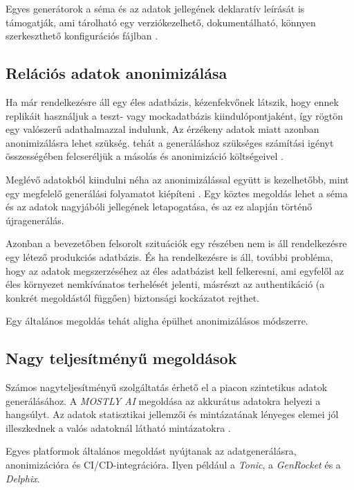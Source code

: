 \documentclass[
    parspace,
    noindent,
    nohyp,
]{elteiktdk}[2023/04/10]
\begin{document}
Egyes generátorok a séma és az adatok jellegének deklaratív leírását is támogatják,
ami tárolható egy verziókezelhető, dokumentálható, könnyen szerkeszthető konfigurációs fájlban%
\cite{Gao2024FakeDB,SoftwareDatamimic,SoftwarePydbgen}.

\subsection{Relációs adatok anonimizálása}

Ha már rendelkezésre áll egy éles adatbázis, kézenfekvőnek látszik,
hogy ennek replikáit használjuk a teszt- vagy mockadatbázis kiindulópontjaként,
így rögtön egy valószerű adathalmazzal indulunk,
Az érzékeny adatok miatt azonban anonimizálásra lehet szükség.
tehát a generáláshoz szükséges számítási igényt összességében
felcseréljük a másolás és anonimizáció költségeivel%
\cite{SoftwareArx,SoftwareAnonymeter}.

Meglévő adatokból kiindulni néha az anonimizálással együtt is kezelhetőbb,
mint egy megfelelő generálási folyamatot kiépíteni%
\cite{Johann2024AnonymizeOrSynthesize}.
Egy köztes megoldás lehet a séma és az adatok nagyjábóli jellegének letapogatása,
és az ez alapján történő újragenerálás.

Azonban a bevezetőben felsorolt szituációk egy részében
nem is áll rendelkezésre egy létező produkciós adatbázis.
És ha rendelkezésre is áll, további probléma,
hogy az adatok megszerzéséhez az éles adatbázist kell felkeresni,
ami egyfelől az éles környezet nemkívánatos terhelését jelenti,
másrészt az authentikáció (a konkrét megoldástól függően) biztonsági kockázatot rejthet.

Egy általános megoldás tehát aligha épülhet anonimizálásos módszerre.

\subsection{Nagy teljesítményű megoldások}

Számos nagyteljesítményű szolgáltatás érhető el a piacon szintetikus adatok generálásához.
A \textit{MOSTLY AI} megoldása az akkurátus adatokra helyezi a hangsúlyt.
Az adatok statisztikai jellemzői és mintázatának lényeges elemei
jól illeszkednek a valós adatoknál látható mintázatokra%
\cite{SoftwareMostlyAi}.

Egyes platformok általános megoldást nyújtanak az adatgenerálásra, anonimizációra és CI/CD-integrációra.
Ilyen például a \textit{Tonic}\cite{WebsiteTonic},
a \textit{GenRocket}\cite{WebsiteGenRocket}
és a \textit{Delphix}\cite{WebsiteDelphix}.
\end{document}
